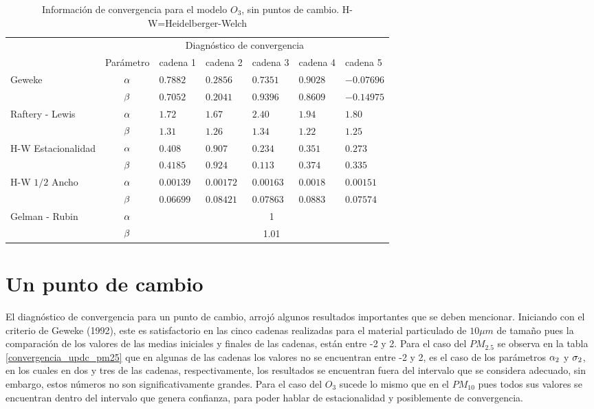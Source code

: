 \begin{table}[!h]
\centering
\begin{tabular}{|l|c|l|l|l|l|l|}
\hline
& \multicolumn{6}{|c|}{Diagnóstico de convergencia} \\
\cline{2-7}
& Parámetro & cadena 1  & cadena 2  & cadena 3 & cadena 4 & cadena 5	 \\
\hline \hline
\multirow{2}{2.5cm}{Geweke} & $\alpha$ & $0.7882$ & $0.2856 $ & $0.7351$ & $0.9028$  & $ -0.07696$\\ \cline{2-7}
& $\beta$& $0.7052 $ & $0.2041$ & $0.9396$ & $0.8609$ & $-0.14975$\\
  \cline{1-7}
\multirow{2}{2.5cm}{Raftery - Lewis} & $\alpha$ & $ 1.72  $& $  1.67$ & $ 2.40$ & $1.94 $ & $ 1.80 $\\ \cline{2-7}
& $\beta$ & \multicolumn{1}{l|}{$1.31$} & $1.26$ & $ 1.34 $ & $1.22 $ & $1.25$ \\ \cline{1-7}
\multirow{2}{2.5cm}{H-W Estacionalidad} & $\alpha$ & $0.408$ & $0.907 $ & $0.234$ & $ 0.351$ & $0.273$ \\ \cline{2-7}
&$\beta$ & \multicolumn{1}{l|}{$0.4185$} & $ 0.924$ &  $ 0.113  $ & $0.374$ & $ 0.335  $ \\ \cline{1-7}
\multirow{2}{2.5cm}{H-W $1/2$ Ancho} & $\alpha$ & $0.00139$ & $0.00172$ & $0.00163$ & $0.0018 $  & $0.00151$  \\ \cline{2-7}
&$\beta$ & \multicolumn{1}{l|}{$0.06699 $} & $0.08421$ & $0.07863$ & $ 0.0883$ & $0.07574 $ \\ \cline{1-7}

\multirow{2}{2.5cm}{Gelman - Rubin} & $\alpha$ & \multicolumn{5}{|c|}{1}\\ \cline{2-7}
&$\beta$ &  \multicolumn{5}{|c|}{1.01} \\ \cline{1-7}

\end{tabular}
\caption{Información de convergencia para el modelo $O_3$, sin puntos de cambio. H-W=Heidelberger-Welch}
\label{converozono}
\end{table}

\section{Un punto de cambio}

El diagnóstico de convergencia para un punto de cambio, arrojó algunos resultados importantes que se deben mencionar. Iniciando con el criterio de Geweke (1992), este es satisfactorio en las cinco cadenas realizadas para el material particulado de $10\mu m$ de tamaño pues la comparación de los valores de las medias iniciales y finales de las cadenas, están entre -2 y 2. Para el caso del $PM_{2.5}$ se observa en la tabla \ref{convergencia_updc_pm25} que en algunas de las cadenas los valores no se encuentran entre -2 y 2, es el caso de los parámetros $\alpha_2$ y $\sigma_2$, en los cuales en dos y tres de las cadenas, respectivamente, los resultados se encuentran fuera del intervalo que se considera adecuado, sin embargo, estos números no son significativamente grandes. Para el caso del $O_3$ sucede lo mismo que en el $PM_{10}$ pues todos sus valores se encuentran dentro del intervalo que genera confianza, para poder hablar de estacionalidad y posiblemente de convergencia. 

